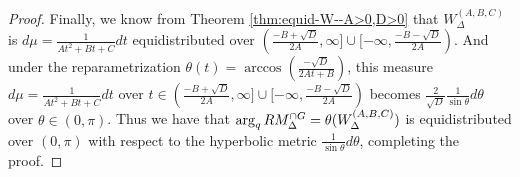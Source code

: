 \documentclass[10pt,a4paper]{amsart}
\newcommand{\RM}{\textnormal{RM}}
\newcommand{\lrp}[1]{\left(#1\right)}
\begin{document}
\begin{proof}
Finally, we know from Theorem \ref{thm:equid-W--A>0,D>0} that $W_{\Delta}^{(A,B,C)}$ is $d\mu = \frac{1}{At^2+Bt+C} dt$ equidistributed over  $(\frac{-B+\sqrt{D}}{2A},\infty] \cup [-\infty,\frac{-B-\sqrt{D}}{2A})$. And under the reparametrization 
$\theta(t) = \arccos\lrp{ \frac{-\sqrt D}{ 2A t+B } }$, this measure
$d\mu = \frac{1}{At^2+Bt+C} dt$ over $t \in (\frac{-B+\sqrt{D}}{2A},\infty] \cup [-\infty,\frac{-B-\sqrt{D}}{2A})$ becomes $\frac{2}{\sqrt{D}} \frac{1}{\sin \theta} d\theta$ over $\theta \in (0,\pi)$. Thus we have that $\arg_q \RM^{\cap G}_{\Delta} = \theta(W_{\Delta}^{(A,B,C)})$ is equidistributed over $(0,\pi)$ with respect to the hyperbolic metric $\frac{1}{\sin \theta} d\theta$, completing the proof.
\end{proof}
\end{document}
